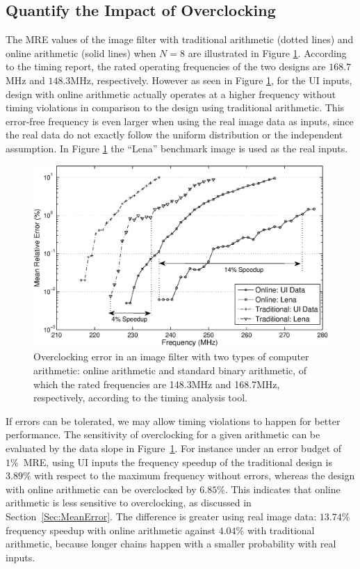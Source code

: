 \documentclass{acm_proc_article-sp}
\begin{document}
\subsection{Quantify the Impact of Overclocking}
The MRE values of the image filter with traditional arithmetic (dotted lines) and online arithmetic (solid lines) when $N=8$ are illustrated in Figure \ref{Fig:MRE_ImageFilter}. According to the timing report, the rated operating frequencies of the two designs are $168.7$MHz and $148.3$MHz, respectively. However as seen in Figure \ref{Fig:MRE_ImageFilter}, for the UI inputs, design with online arithmetic actually operates at a higher frequency without timing violations in comparison to the design using traditional arithmetic. This error-free frequency is even larger when using the real image data as inputs, since the real data do not exactly follow the uniform distribution or the independent assumption. In Figure \ref{Fig:MRE_ImageFilter} the ``Lena'' benchmark image is used as the real inputs.
%
\begin{figure}
    \centering
    \includegraphics[width=.48\textwidth]{./Figures/MRE.eps}
    \vspace{-4ex}
    \caption{Overclocking error in an image filter with two types of computer arithmetic: online arithmetic and standard binary arithmetic, of which the rated frequencies are 148.3MHz and 168.7MHz, respectively, according to the timing analysis tool.}
    \label{Fig:MRE_ImageFilter}
    \vspace{-3ex}
\end{figure}

\vspace{-1ex}
If errors can be tolerated, we may allow timing violations to happen for better performance. The sensitivity of overclocking for a given arithmetic can be evaluated by the data slope in Figure~\ref{Fig:MRE_ImageFilter}. For instance under an error budget of $1\%$~MRE, using UI inputs the frequency speedup of the traditional design is $3.89\%$ with respect to the maximum frequency without errors, whereas the design with online arithmetic can be overclocked by $6.85\%$. This indicates that online arithmetic is less sensitive to overclocking, as discussed in Section~\ref{Sec:MeanError}. The difference is greater using real image data: $13.74\%$ frequency speedup with online arithmetic against $4.04\%$ with traditional arithmetic, because longer chains happen with a smaller probability with real inputs.\vspace{-1ex}
\end{document}
